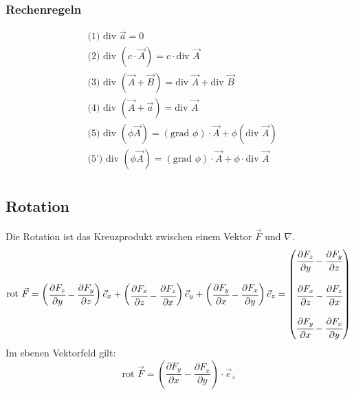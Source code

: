\documentclass[a4paper,10pt]{scrartcl}
\begin{document}
        \subsubsection*{Rechenregeln}
        \begin{equation*}
            \begin{aligned}
                & \text{(1) } \text{div } \vec{a} = 0 \\
                & \text{(2) } \text{div } (c \cdot \vec{A}) = c \cdot \text{div } \vec{A} \\
                & \text{(3) } \text{div } (\vec{A} + \vec{B}) = \text{div } \vec{A} + \text{div } \vec{B} \\
                & \text{(4) } \text{div } (\vec{A} + \vec{a}) = \text{div } \vec{A} \\
                & \text{(5) } \text{div } (\phi \vec{A})= (\text{grad } \phi) \cdot \vec{A} + \phi(\text{div } \vec{A}) \\
                & \text{(5') } \text{div } (\phi \vec{A})= (\text{grad } \phi) \cdot \vec{A} + \phi \cdot \text{div } \vec{A} \\
            \end{aligned}
        \end{equation*}

        \subsection{Rotation}
        Die Rotation ist das Kreuzprodukt zwischen einem Vektor \(\vec{F}\) und \(\nabla\). 
        \begin{equation*}
            \text{rot } \vec{F} = \begin{pmatrix}
                \cfrac{\partial F_z}{\partial y}  - \cfrac{ \partial F_y}{\partial z}
            \end{pmatrix} \vec{e}_x + 
            \begin{pmatrix}
                \cfrac{\partial F_x}{\partial z}  - \cfrac{ \partial F_z}{\partial x}
            \end{pmatrix} \vec{e}_y +
            \begin{pmatrix}
                \cfrac{\partial F_y}{\partial x}  - \cfrac{ \partial F_x}{\partial y}
            \end{pmatrix} \vec{e}_z =            
            \begin{pmatrix}
                \cfrac{\partial F_z}{\partial y}  - \cfrac{ \partial F_y}{\partial z} \\
                \\
                \cfrac{\partial F_x}{\partial z}  - \cfrac{ \partial F_z}{\partial x} \\ \\
                \cfrac{\partial F_y}{\partial x}  - \cfrac{ \partial F_x}{\partial y}
            \end{pmatrix}
        \end{equation*}
        Im ebenen Vektorfeld gilt:
        \begin{equation*}
            \text{rot }\vec{F} = \left(\frac{\partial F_y}{\partial x} - \frac{\partial F_x}{\partial y}\right)\cdot \vec{e}_z
        \end{equation*}
\end{document}
